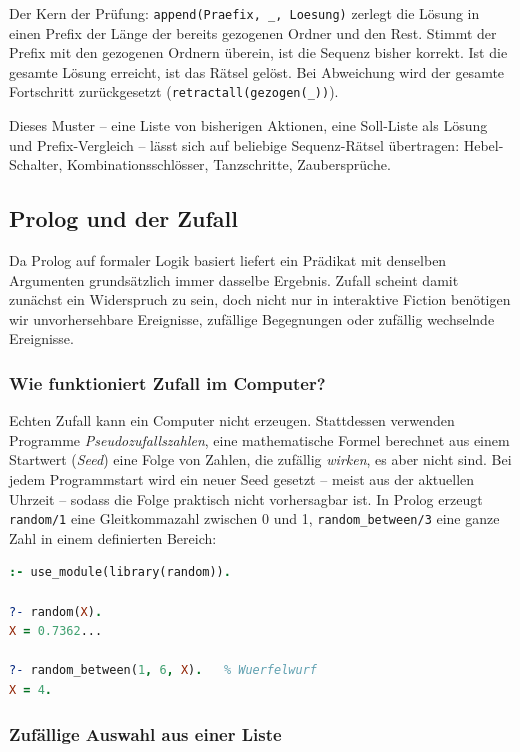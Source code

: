 \documentclass[parskip=half,a4paper,11pt]{scrreprt}
\begin{document}
Der Kern der Prüfung: \texttt{append(Praefix, \_, Loesung)} zerlegt die Lösung in einen Prefix der Länge der bereits gezogenen Ordner und den Rest. Stimmt der Prefix mit den gezogenen Ordnern überein, ist die Sequenz bisher korrekt. Ist die gesamte Lösung erreicht, ist das Rätsel gelöst. Bei Abweichung wird der gesamte Fortschritt zurückgesetzt (\texttt{retractall(gezogen(\_))}).

Dieses Muster – eine Liste von bisherigen Aktionen, eine Soll-Liste als Lösung und Prefix-Vergleich – lässt sich auf beliebige Sequenz-Rätsel übertragen: Hebel-Schalter, Kombinationsschlösser, Tanzschritte, Zaubersprüche.

\subsection{Prolog und der Zufall}

Da Prolog auf formaler Logik basiert liefert ein Prädikat mit denselben Argumenten grundsätzlich immer dasselbe Ergebnis. Zufall scheint damit zunächst ein Widerspruch zu sein, doch nicht nur in interaktive Fiction benötigen wir unvorhersehbare Ereignisse, zufällige Begegnungen oder zufällig wechselnde Ereignisse.

\subsubsection{Wie funktioniert Zufall im Computer?}

Echten Zufall kann ein Computer nicht erzeugen. Stattdessen verwenden Programme \emph{Pseudozufallszahlen}, eine mathematische Formel berechnet aus einem Startwert (\emph{Seed}) eine Folge von Zahlen, die zufällig \emph{wirken}, es aber nicht sind. Bei jedem Programmstart wird ein neuer Seed gesetzt – meist aus der aktuellen Uhrzeit – sodass die Folge praktisch nicht vorhersagbar ist. In Prolog erzeugt \texttt{random/1} eine Gleitkommazahl zwischen 0 und 1, \texttt{random\_between/3} eine ganze Zahl in einem definierten Bereich:
\begin{lstlisting}[language=Prolog, caption={}]
:- use_module(library(random)).

?- random(X).
X = 0.7362...

?- random_between(1, 6, X).   % Wuerfelwurf
X = 4.
\end{lstlisting}
\subsubsection{Zufällige Auswahl aus einer Liste}
\end{document}
